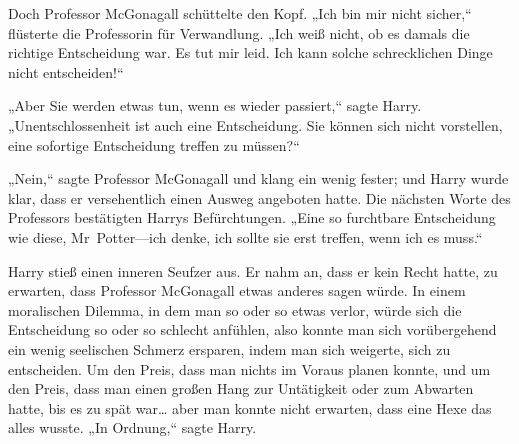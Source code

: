 Doch Professor McGonagall schüttelte den Kopf. „Ich bin mir nicht sicher,“ flüsterte die Professorin für Verwandlung. „Ich weiß nicht, ob es damals die richtige Entscheidung war. Es tut mir leid. Ich kann solche schrecklichen Dinge nicht entscheiden!“

„Aber Sie werden etwas tun, wenn es wieder passiert,“ sagte Harry. „Unentschlossenheit ist auch eine Entscheidung. Sie können sich nicht vorstellen, eine sofortige Entscheidung treffen zu müssen?“

„Nein,“ sagte Professor McGonagall und klang ein wenig fester; und Harry wurde klar, dass er versehentlich einen Ausweg angeboten hatte. Die nächsten Worte des Professors bestätigten Harrys Befürchtungen. „Eine so furchtbare Entscheidung wie diese, Mr~Potter—ich denke, ich sollte sie erst treffen, wenn ich es muss.“

Harry stieß einen inneren Seufzer aus. Er nahm an, dass er kein Recht hatte, zu erwarten, dass Professor McGonagall etwas anderes sagen würde. In einem moralischen Dilemma, in dem man so oder so etwas verlor, würde sich die Entscheidung so oder so schlecht anfühlen, also konnte man sich vorübergehend ein wenig seelischen Schmerz ersparen, indem man sich weigerte, sich zu entscheiden. Um den Preis, dass man nichts im Voraus planen konnte, und um den Preis, dass man einen großen Hang zur Untätigkeit oder zum Abwarten hatte, bis es zu spät war… aber man konnte nicht erwarten, dass eine Hexe das alles wusste.
„In Ordnung,“ sagte Harry.

